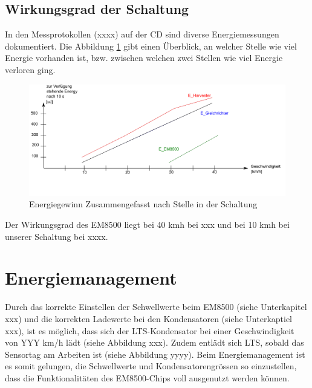 \subsection{Wirkungsgrad der Schaltung}

In den Messprotokollen (xxxx) auf der CD sind diverse Energiemessungen dokumentiert. Die Abbildung \ref{zsmEnergyGewinn} gibt einen Überblick, an welcher Stelle wie viel Energie vorhanden ist, bzw. zwischen welchen zwei Stellen wie viel Energie verloren ging.

\begin{figure}\label{zsmEnergyGewinn}
\includegraphics[width=1\textwidth]{4Resultate/imag/EnergyGewinnNachStelle.png} 
\caption{Energiegewinn Zusammengefasst nach Stelle in der Schaltung }
\end{figure}

Der Wirkungsgrad des EM8500 liegt bei 40 km\/h  bei xxx und bei 10 km\/h bei unserer Schaltung bei xxxx. 




\section{Energiemanagement}


Durch das korrekte Einstellen der Schwellwerte beim EM8500 (siehe Unterkapitel xxx) und die korrekten Ladewerte bei den Kondensatoren (siehe Unterkaptiel xxx), ist es möglich, dass sich der LTS-Kondensator bei einer Geschwindigkeit von YYY km/h lädt (siehe Abbildung xxx). Zudem entlädt sich LTS, sobald das Sensortag am Arbeiten ist (siehe Abbildung yyyy). Beim Energiemanagement ist es somit gelungen, die Schwellwerte und Kondensatorengrössen so einzustellen, dass die Funktionalitäten des EM8500-Chips voll ausgenutzt werden können.


